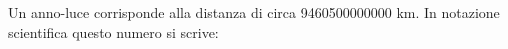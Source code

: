 Un anno-luce corrisponde alla distanza di circa 9460500000000 km. 
In notazione scientifica questo numero si scrive: